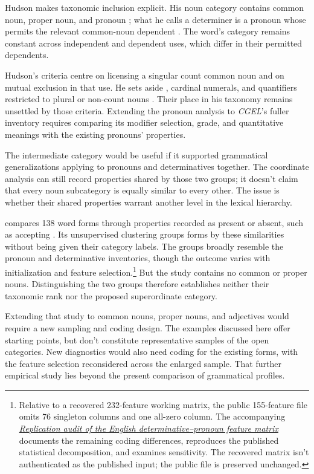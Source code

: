 \documentclass[12pt]{article}
\begin{document}
Hudson makes taxonomic inclusion explicit. His noun category contains common noun, proper noun, and pronoun \citep[253--254]{hudson2010wordgrammar}; what he calls a determiner is a pronoun whose  permits the relevant common-noun dependent \citep[9--10]{hudson2004determiners}. The word's category remains constant across independent and dependent uses, which differ in their permitted dependents.

Hudson's criteria centre on licensing a singular count common noun and on mutual exclusion in that use. He sets aside , cardinal numerals, and quantifiers restricted to plural or non-count nouns \citep[9--10]{hudson2004determiners}. Their place in his taxonomy remains unsettled by those criteria. Extending the pronoun analysis to \textit{CGEL}'s fuller inventory requires comparing its modifier selection, grade, and quantitative meanings with the existing pronouns' properties.

The intermediate category would be useful if it supported grammatical generalizations applying to pronouns and determinatives together. The coordinate analysis can still record properties shared by those two groups; it doesn't claim that every noun subcategory is equally similar to every other. The issue is whether their shared properties warrant another level in the lexical hierarchy.

\textcite{reynolds2021} compares 138 word forms through properties recorded as present or absent, such as accepting . Its unsupervised clustering groups forms by these similarities without being given their category labels. The groups broadly resemble the pronoun and determinative inventories, though the outcome varies with initialization and feature selection.\footnote{Relative to a recovered 232-feature working matrix, the public 155-feature file omits 76 singleton columns and one all-zero column. The accompanying \href{run:matrix-audit.pdf}{\textit{Replication audit of the English determinative--pronoun feature matrix}} documents the remaining coding differences, reproduces the published statistical decomposition, and examines sensitivity. The recovered matrix isn't authenticated as the published input; the public file is preserved unchanged.} But the study contains no common or proper nouns. Distinguishing the two groups therefore establishes neither their taxonomic rank nor the proposed superordinate category.

Extending that study to common nouns, proper nouns, and adjectives would require a new sampling and coding design. The examples discussed here offer starting points, but don't constitute representative samples of the open categories. New diagnostics would also need coding for the existing forms, with the feature selection reconsidered across the enlarged sample. That further empirical study lies beyond the present comparison of grammatical profiles.
\end{document}
